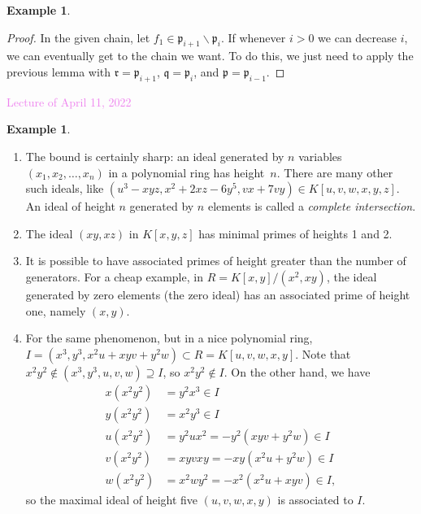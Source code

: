 \documentclass{amsart}[12pt]
\newcommand{\Apr}[1]{\textcolor{violet}{Lecture of April #1, 2022}}
\newcommand{\p}{{\mathfrak p}}
\newcommand{\q}{{\mathfrak q}}
\numberwithin{equation}{section}
\theoremstyle{plain} %
\theoremstyle{definition}
\newtheorem{ex}[equation]{Example}
\newtheorem{example}[equation]{Example}
\theoremstyle{remark}
\begin{document}
\begin{ex}
\begin{proof}
In the given chain, let $f_1 \in \p_{i+1} \smallsetminus \p_i$. If whenever $i>0$ we can decrease $i$, we can eventually get to the chain we want. To do this, we just need to apply the previous lemma with $\mathfrak{r}=\p_{i+1}$, $\q=\p_i$, and $\p=\p_{i-1}$.
\end{proof}

\Apr{11}

\begin{example}
	\begin{enumerate}
		\item The bound is certainly sharp: an ideal generated by $n$ variables $(x_1,x_2,\dots,x_n)$ in a polynomial ring has height~$n$. There are many other such ideals, like $(u^3-xyz,x^2+2xz-6y^5,vx+7vy)\in K[u,v,w,x,y,z]$. An ideal of height $n$ generated by $n$ elements is called a \emph{complete intersection}.
		\item The ideal $(xy,xz)$ in $K[x,y,z]$ has minimal primes of heights 1 and 2.
		\item It is possible to have associated primes of height greater than the number of generators. For a cheap example, in $R=K[x,y]/(x^2,xy)$, the ideal generated by zero elements (the zero ideal) has an associated prime of height one, namely $(x,y)$.
		\item For the same phenomenon, but in a nice polynomial ring, $I=(x^3, y^3, x^2 u + xy v + y^2 w) \subset R= K[u,v,w,x,y]$. Note that $x^2 y^2 \notin (x^3,y^3, u,v,w) \supseteq I$, so $x^2 y^2\notin I$. On the other hand, we have
	\[	\begin{aligned}
		x(x^2 y^2) &= y^2 x^3\in I \\	y(x^2 y^2)&= x^2 y^3 \in I  \\
		u(x^2 y^2) &= y^2 ux^2 = -y^2(xyv + y^2w) \in I \\
		v(x^2 y^2) &= xy vxy = -xy (x^2 u + y^2 w) \in I \\
		w(x^2 y^2) &= x^2 w y^2 = -x^2( x^2 u + xy v) \in I,\end{aligned}\]
		so the maximal ideal of height five $(u,v,w,x,y)$ is associated to $I$.
		\end{enumerate}
\end{example}


\end{ex}
\end{document}
